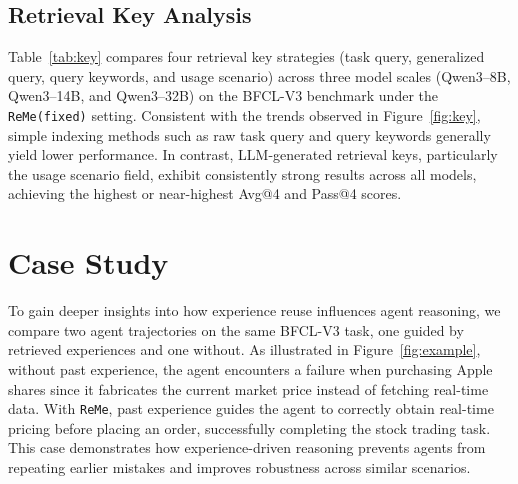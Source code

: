 \documentclass[11pt]{article}
\newcommand{\ours}{\texttt{ReMe}}
\begin{document}
\subsection{Retrieval Key Analysis}\label{app:retrieval_key}
Table~\ref{tab:key} compares four retrieval key strategies (task query, generalized query, query keywords, and usage scenario) across three model scales (Qwen3–8B, Qwen3–14B, and Qwen3–32B) on the BFCL-V3 benchmark under the {\ours}\texttt{(fixed)} setting. 
Consistent with the trends observed in Figure~\ref{fig:key}, simple indexing methods such as raw task query and query keywords generally yield lower performance. 
In contrast, LLM-generated retrieval keys, particularly the usage scenario field, exhibit consistently strong results across all models, achieving the highest or near-highest Avg@4 and Pass@4 scores. 


\section{Case Study}
To gain deeper insights into how experience reuse influences agent reasoning, we compare two agent trajectories on the same BFCL-V3 task, one guided by retrieved experiences and one without. 
As illustrated in Figure~\ref{fig:example}, without past experience, the agent encounters a failure when purchasing Apple shares since it fabricates the current market price instead of fetching real-time data. 
With {\ours}, past experience guides the agent to correctly obtain real-time pricing before placing an order, successfully completing the stock trading task. 
This case demonstrates how experience-driven reasoning prevents agents from repeating earlier mistakes and improves robustness across similar scenarios.
\end{document}
